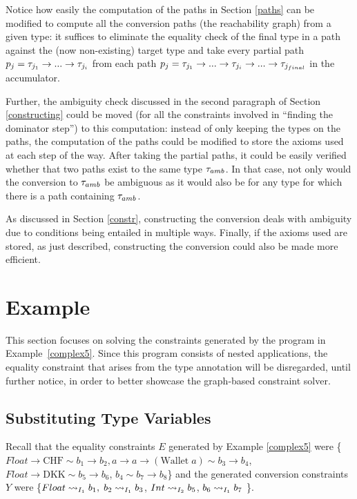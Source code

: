 Notice how easily the computation of the paths in Section \ref{paths} can be modified to compute all the conversion paths (the reachability graph) from a given type: it suffices to eliminate the equality check of the final type in a path against the (now non-existing) target type and take every partial path $p_j = \type_{j_1}\to ... \to \type_{j_i}$ from each path $p_j = \type_{j_1}\to ... \to \type_{j_i} \to ... \to \type_{j_{final}}$ in the accumulator.

Further, the ambiguity check discussed in the second paragraph of Section \ref{constructing} could be moved (for all the constraints involved in ``finding the dominator step'') to this computation: instead of only keeping the types on the paths, the computation of the paths could be modified to store the axioms used at each step of the way. After taking the partial paths, it could be easily verified whether that two paths exist to the same type $\type_{amb}$. In that case, not only would the conversion to $\type_{amb}$ be ambiguous as it would also be for any type for which there is a path containing $\type_{amb}$.

As discussed in Section \ref{constr}, constructing the conversion deals with ambiguity due to conditions being entailed in multiple ways. Finally, if the axioms used are stored, as just described, constructing the conversion could also be made more efficient.



\section{Example}
\label{6.4}
This section focuses on solving the constraints generated by the program in Example~\ref{complex5}. Since this program consists of nested applications, the equality constraint that arises from the type annotation will be disregarded, until further notice, in order to better showcase the graph-based constraint solver.
\subsection{Substituting Type Variables}
Recall that the equality constraints $E$ generated by Example \ref{complex5} were \{$Float\to \text{CHF} \sim b_1 \to b_2, a \to a \to (\text{Wallet} \; a) \sim b_3 \to b_4$, $Float \to \text{DKK} \sim b_5 \to b_6$, $b_4 \sim b_7 \to b_8$\} and the generated conversion constraints $Y$ were \{$\convX{\imEnv_1}{Float}{b_1},\; \convX{\imEnv_1}{b_2}{b_3}$,\; $\convX{\imEnv_2}{Int}{b_5}$,\; $\convX{\imEnv_1}{b_6}{b_7}$ \}.

